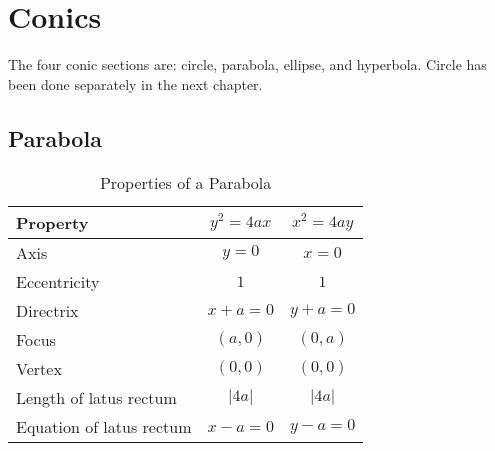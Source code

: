 \documentclass[../main.tex]{subfile}
\begin{document}
    \chapter{Conics}
    The four conic sections are: circle, parabola, ellipse, and hyperbola. Circle has been done separately in the next chapter.
    

    \section{Parabola}
        \begin{table}[h!]
        \caption{Properties of a Parabola}
        \label{parabola}
            \begin{center}
                \begin{tabular}{l|c|c}
                    Property&$y^2=4ax$&$x^2=4ay$\\
                    \hline
                    Axis&$y=0$&$x=0$\\
                    Eccentricity&$1$&$1$\\
                    Directrix&$x+a=0$&$y+a=0$\\
                    Focus&$(a,0)$&$(0,a)$\\
                    Vertex&$(0,0)$&$(0,0)$\\
                    Length of latus rectum&$\lvert 4a \rvert$&$\lvert 4a \rvert$\\
                    Equation of latus rectum&$x-a=0$&$y-a=0$\\
                \end{tabular}
            \end{center}
        \end{table}

    
\end{document}
